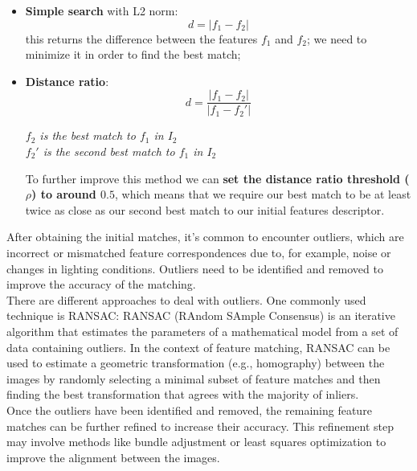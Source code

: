 \documentclass{article}
\begin{document}
\begin{itemize}
    \item \textbf{Simple search} with L2 norm:
        \begin{equation*}
            d = | f_1 - f_2 |
        \end{equation*}
        this returns the difference between the features $f_1$ and $f_2$; we need to minimize it in order to find the best match;
    \item \textbf{Distance ratio}:
        \begin{equation*}
            d = \frac{|f_1 - f_2|}{|f_1 - f_2'|}
        \end{equation*}
        \begin{center}
            \textit{$f_2$ is the best match to $f_1$ in $I_2$} \\
            \textit{$f_2'$ is the second best match to $f_1$ in $I_2$}
        \end{center}
        To further improve this method we can \textbf{set the distance ratio threshold ($\rho$) to around $0.5$}, which means that we require our best match to be at least twice as close as our second best match to our initial features descriptor. 
\end{itemize}

After obtaining the initial matches, it's common to encounter outliers, which are incorrect or mismatched feature correspondences due to, for example, noise or changes in lighting conditions. Outliers need to be identified and removed to improve the accuracy of the matching. \\

There are different approaches to deal with outliers. One commonly used technique is RANSAC: RANSAC (RAndom SAmple Consensus) is an iterative algorithm that estimates the parameters of a mathematical model from a set of data containing outliers. In the context of feature matching, RANSAC can be used to estimate a geometric transformation (e.g., homography) between the images by randomly selecting a minimal subset of feature matches and then finding the best transformation that agrees with the majority of inliers. \\

Once the outliers have been identified and removed, the remaining feature matches can be further refined to increase their accuracy. This refinement step may involve methods like bundle adjustment or least squares optimization to improve the alignment between the images.
\end{document}
